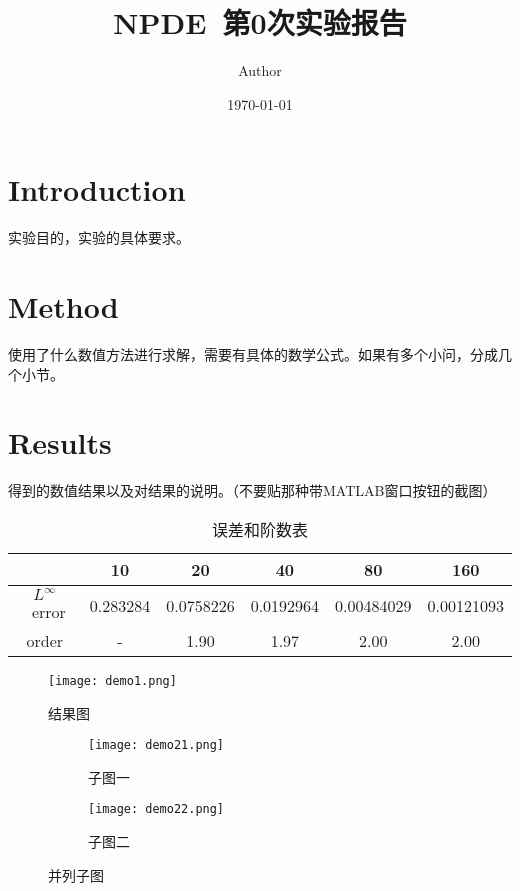\documentclass{article}
\title{NPDE~第0次实验报告}
\author{Author}
\date{\today}
\begin{document}
\maketitle

\section{Introduction}

实验目的，实验的具体要求。

\section{Method}

使用了什么数值方法进行求解，需要有具体的数学公式。如果有多个小问，分成几个小节。


\section{Results}

得到的数值结果以及对结果的说明。（不要贴那种带MATLAB窗口按钮的截图）


\begin{table}[ht]
    \centering
    \caption{误差和阶数表}\label{tab:demo0}
    \begin{tabular}{c|ccccc}
        \hline
                           & 10       & 20        & 40        & 80         & 160        \\
        \hline
        $L^{\infty}$~error & 0.283284 & 0.0758226 & 0.0192964 & 0.00484029 & 0.00121093 \\
        order              & -        & 1.90      & 1.97      & 2.00       & 2.00       \\
        \hline
    \end{tabular}
\end{table}

\begin{figure}[htbp]
    \centering
    \texttt{[image: demo1.png]}
    \caption{结果图}\label{fig:demo1}
\end{figure}

\begin{figure}[htbp]
    \centering
    \begin{subfigure}[b]{0.47\textwidth}
        \centering
        \texttt{[image: demo21.png]}
        \caption{子图一}
        \label{fig:demo2-a}
    \end{subfigure}
    \begin{subfigure}[b]{0.47\textwidth}
        \centering
        \texttt{[image: demo22.png]}
        \caption{子图二}
        \label{fig:demo2-b}
    \end{subfigure}
    \caption{并列子图}
    \label{fig:demo2}
\end{figure}
\end{document}
